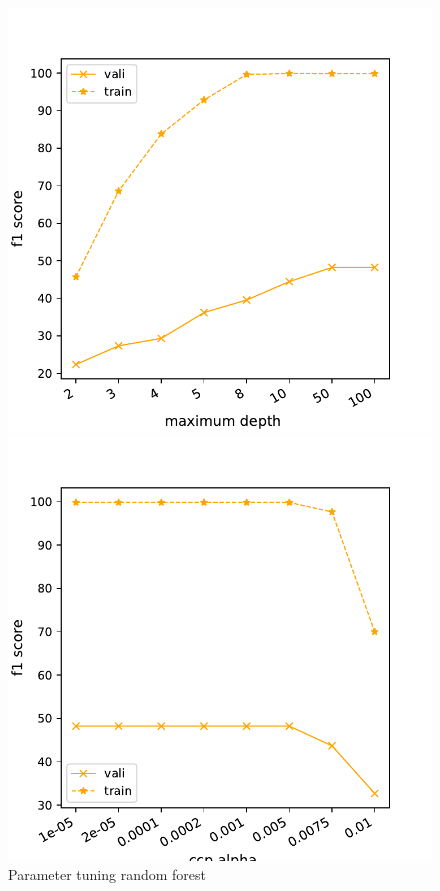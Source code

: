 \documentclass[11pt]{article}
\begin{document}
\begin{figure}[t]
\begin{minipage}[t]{0.33\textwidth}
\end{minipage}
\begin{minipage}[t]{0.33\textwidth}
\includegraphics[width=1\linewidth]{amazon/RF_max_depth.pdf}
\end{minipage}
\begin{minipage}[t]{0.33\textwidth}
\includegraphics[width=1\linewidth]{amazon/RF_ccp_alpha.pdf}
\end{minipage}
\caption{Parameter tuning random forest}
\label{Fig::Random forest parameter tuning}
\end{figure}
\end{document}
